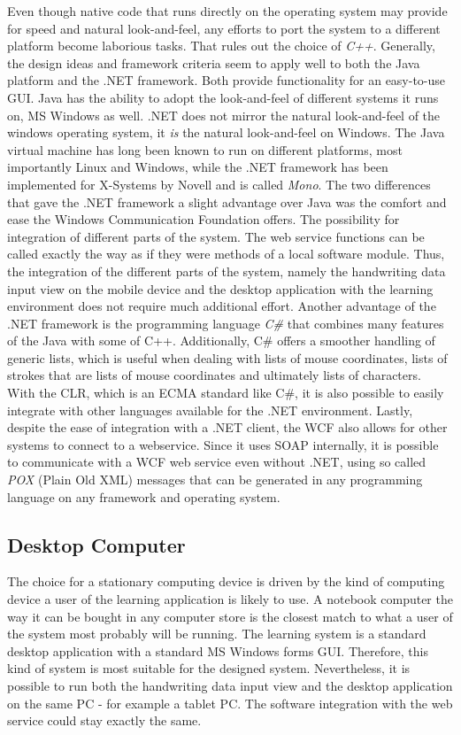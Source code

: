Even though native code that runs directly on the operating system may 
provide for speed and natural look-and-feel, any efforts to port the system
to a different platform become laborious tasks. That rules out the choice of
\emph{C++}.
Generally, the design ideas and framework criteria seem to apply well to both 
the Java platform and the .NET framework. Both provide functionality for an 
easy-to-use GUI. Java has the ability to adopt the look-and-feel of different systems it runs on, MS Windows as well. 
.NET does not mirror the natural look-and-feel of the windows
operating system, it \emph{is} the natural look-and-feel on Windows.
The Java virtual machine has long been known to run on 
different platforms, most importantly Linux and Windows, 
while the .NET framework has been implemented for X-Systems by Novell and is 
called \emph{Mono}.
The two differences that gave the .NET framework a slight advantage over Java 
was the comfort and ease the Windows Communication Foundation offers.
The possibility for integration of different parts of the system.
The web service functions can be called exactly the way as if they were methods 
of a local software module. Thus, the integration of the different parts of the 
system, namely the handwriting data input view on the mobile device and 
the desktop application with the learning environment does not 
require much additional effort. Another advantage of the .NET framework is the 
programming language \emph{C\#} that combines many features of the Java with 
some of C++.
Additionally, C\# offers a smoother handling of generic lists, which is useful
when dealing with lists of mouse coordinates, lists of strokes that are lists
of mouse coordinates and ultimately lists of characters.
With the CLR, which is an ECMA standard like C\#, it is also possible to easily 
integrate with other languages available for the .NET environment.
Lastly, despite the ease of integration with a .NET client, the WCF also allows 
for other systems to connect to a webservice. Since it uses SOAP internally, 
it is possible to communicate with a WCF web service even without .NET, using
so called \emph{POX} (Plain Old XML) messages that can be generated in any
programming language on any framework and operating system.

\subsection{Desktop Computer}
\label{sec:desktopcomputer}

The choice for a stationary computing device is driven by the kind of 
computing device a user of the learning application is likely to use. 
A notebook computer the way it can be 
bought in any computer store is the closest match to what a user of the system  
most probably will be running. 
The learning system is a standard desktop application with a standard 
MS Windows forms GUI. Therefore, this kind of system is most suitable for the
designed system.
Nevertheless, it is possible to run both the handwriting data input view and
the desktop application on the same PC - for example a tablet PC.
The software integration with the web service could stay exactly the same.

